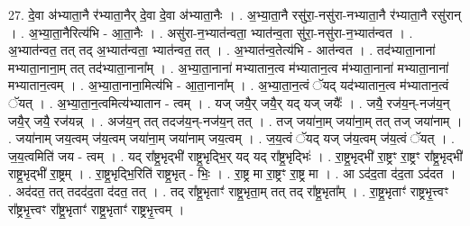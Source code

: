 \documentclass[17pt]{extarticle}
\begin{document}
27. दे॒वा अ॑भ्याता॒नै र॑भ्याता॒नैर् दे॒वा दे॒वा अ॑भ्याता॒नैः । . अ॒भ्या॒ता॒नै रसु॑रा॒-नसु॑रा-नभ्याता॒नै र॑भ्याता॒नै रसु॑रान् । . अ॒भ्या॒ता॒नैरित्य॑भि - आ॒ता॒नैः । . असु॑रा-न॒भ्यात॑न्वता॒ भ्यात॑न्व॒ता सु॑रा॒-नसु॑रा-न॒भ्यात॑न्वत । . अ॒भ्यात॑न्वत॒ तत् तद् अ॒भ्यात॑न्वता॒ भ्यात॑न्वत॒ तत् । . अ॒भ्यात॑न्व॒तेत्य॑भि - आत॑न्वत । . तद॑भ्याता॒नाना॑ मभ्याता॒नाना॒म् तत् तद॑भ्याता॒नाना᳚म् । . अ॒भ्या॒ता॒नाना॑ मभ्यातान॒त्व म॑भ्यातान॒त्व म॑भ्याता॒नाना॑ मभ्याता॒नाना॑ मभ्यातान॒त्वम् । . अ॒भ्या॒ता॒नाना॒मित्य॑भि - आ॒ता॒नाना᳚म् । . अ॒भ्या॒ता॒न॒त्वं ॅयद् यद॑भ्यातान॒त्व म॑भ्यातान॒त्वं ॅयत् । . अ॒भ्या॒ता॒न॒त्वमित्य॑भ्यातान - त्वम् । . यज् जयै॒र् जयै॒र् यद् यज् जयैः᳚ । . जयै॒ रज॑य॒न्-नज॑य॒न् जयै॒र् जयै॒ रज॑यन्न् । . अज॑य॒न् तत् तदज॑य॒न्-नज॑य॒न् तत् । . तज् जया॑ना॒म् जया॑ना॒म् तत् तज् जया॑नाम् । . जया॑नाम् जय॒त्वम् ज॑य॒त्वम् जया॑ना॒म् जया॑नाम् जय॒त्वम् । . ज॒य॒त्वं ॅयद् यज् ज॑य॒त्वम् ज॑य॒त्वं ॅयत् । . ज॒य॒त्वमिति॑ जय - त्वम् । . यद् रा᳚ष्ट्र॒भृद्भी॑ राष्ट्र॒भृद्भि॒र् यद् यद् रा᳚ष्ट्र॒भृद्भिः॑ । . रा॒ष्ट्र॒भृद्भी॑ रा॒ष्ट्रꣳ रा॒ष्ट्रꣳ रा᳚ष्ट्र॒भृद्भी॑ राष्ट्र॒भृद्भी॑ रा॒ष्ट्रम् । . रा॒ष्ट्र॒भृद्भि॒रिति॑ राष्ट्र॒भृत् - भिः॒ । . रा॒ष्ट्र मा रा॒ष्ट्रꣳ रा॒ष्ट्र मा । . आ ऽद॑द॒ता द॑द॒ता ऽद॑दत । . अद॑दत॒ तत् तदद॑द॒ता द॑दत॒ तत् । . तद् रा᳚ष्ट्र॒भृताꣳ॑ राष्ट्र॒भृता॒म् तत् तद् रा᳚ष्ट्र॒भृता᳚म् । . रा॒ष्ट्र॒भृताꣳ॑ राष्ट्रभृ॒त्त्वꣳ रा᳚ष्ट्रभृ॒त्त्वꣳ रा᳚ष्ट्र॒भृताꣳ॑ राष्ट्र॒भृताꣳ॑ राष्ट्रभृ॒त्त्वम् । \newline
\end{document}
